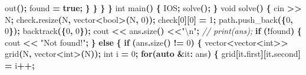 \documentclass[
]{article}
\newenvironment{Shaded}{\begin{snugshade}}{\end{snugshade}}
\newcommand{\CommentTok}[1]{\textcolor[rgb]{0.56,0.35,0.01}{\textit{#1}}}
\newcommand{\ControlFlowTok}[1]{\textcolor[rgb]{0.13,0.29,0.53}{\textbf{#1}}}
\newcommand{\DataTypeTok}[1]{\textcolor[rgb]{0.13,0.29,0.53}{#1}}
\newcommand{\DecValTok}[1]{\textcolor[rgb]{0.00,0.00,0.81}{#1}}
\newcommand{\KeywordTok}[1]{\textcolor[rgb]{0.13,0.29,0.53}{\textbf{#1}}}
\newcommand{\NormalTok}[1]{#1}
\newcommand{\OperatorTok}[1]{\textcolor[rgb]{0.81,0.36,0.00}{\textbf{#1}}}
\newcommand{\SpecialCharTok}[1]{\textcolor[rgb]{0.00,0.00,0.00}{#1}}
\newcommand{\StringTok}[1]{\textcolor[rgb]{0.31,0.60,0.02}{#1}}
\begin{document}
\begin{Shaded}
\begin{Highlighting}[]
\NormalTok{                out}\OperatorTok{();}
\NormalTok{                found }\OperatorTok{=} \KeywordTok{true}\OperatorTok{;}
            \OperatorTok{\}}
        \OperatorTok{\}}
    \OperatorTok{\}}
\OperatorTok{\}}
\DataTypeTok{int}\NormalTok{ main}\OperatorTok{()}
\OperatorTok{\{}
\NormalTok{    IOS}\OperatorTok{;}
\NormalTok{    solve}\OperatorTok{();}
\OperatorTok{\}}
\DataTypeTok{void}\NormalTok{ solve}\OperatorTok{()} \OperatorTok{\{}
\NormalTok{    cin }\OperatorTok{\textgreater{}\textgreater{}}\NormalTok{ N}\OperatorTok{;}    
\NormalTok{    check}\OperatorTok{.}\NormalTok{resize}\OperatorTok{(}\NormalTok{N}\OperatorTok{,}\NormalTok{ vector}\OperatorTok{\textless{}}\DataTypeTok{bool}\OperatorTok{\textgreater{}(}\NormalTok{N}\OperatorTok{,} \DecValTok{0}\OperatorTok{));}
\NormalTok{    check}\OperatorTok{[}\DecValTok{0}\OperatorTok{][}\DecValTok{0}\OperatorTok{]} \OperatorTok{=} \DecValTok{1}\OperatorTok{;}
\NormalTok{    path}\OperatorTok{.}\NormalTok{push\_back}\OperatorTok{(\{}\DecValTok{0}\OperatorTok{,} \DecValTok{0}\OperatorTok{\});}
\NormalTok{    backtrack}\OperatorTok{(\{}\DecValTok{0}\OperatorTok{,} \DecValTok{0}\OperatorTok{\});}
\NormalTok{    cout }\OperatorTok{\textless{}\textless{}}\NormalTok{ ans}\OperatorTok{.}\NormalTok{size}\OperatorTok{()} \OperatorTok{\textless{}\textless{}}\StringTok{"}\SpecialCharTok{\textbackslash{}n}\StringTok{"}\OperatorTok{;}
    \CommentTok{// print(ans);}
    \ControlFlowTok{if} \OperatorTok{(!}\NormalTok{found}\OperatorTok{)} \OperatorTok{\{}
\NormalTok{        cout }\OperatorTok{\textless{}\textless{}} \StringTok{"Not found!"}\OperatorTok{;}
    \OperatorTok{\}} \ControlFlowTok{else} \OperatorTok{\{}
        \ControlFlowTok{if} \OperatorTok{(}\NormalTok{ans}\OperatorTok{.}\NormalTok{size}\OperatorTok{()} \OperatorTok{!=} \DecValTok{0}\OperatorTok{)} \OperatorTok{\{}
\NormalTok{            vector}\OperatorTok{\textless{}}\NormalTok{vector}\OperatorTok{\textless{}}\DataTypeTok{int}\OperatorTok{\textgreater{}\textgreater{}}\NormalTok{ grid}\OperatorTok{(}\NormalTok{N}\OperatorTok{,}\NormalTok{ vector}\OperatorTok{\textless{}}\DataTypeTok{int}\OperatorTok{\textgreater{}(}\NormalTok{N}\OperatorTok{));}
            \DataTypeTok{int}\NormalTok{ i }\OperatorTok{=} \DecValTok{0}\OperatorTok{;}
            \ControlFlowTok{for}\OperatorTok{(}\KeywordTok{auto} \OperatorTok{\&}\NormalTok{it}\OperatorTok{:}\NormalTok{ ans}\OperatorTok{)} \OperatorTok{\{}
\NormalTok{                grid}\OperatorTok{[}\NormalTok{it}\OperatorTok{.}\NormalTok{first}\OperatorTok{][}\NormalTok{it}\OperatorTok{.}\NormalTok{second}\OperatorTok{]} \OperatorTok{=}\NormalTok{ i}\OperatorTok{++;}

\end{Highlighting}
\end{Shaded}
\end{document}
